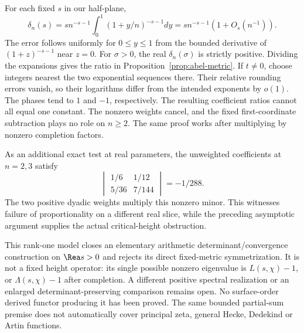 For each fixed $s$ in our half-plane,
\[
 \delta_n(s)=s n^{-s-1}\int_0^1(1+y/n)^{-s-1}dy
           =s n^{-s-1}(1+O_s(n^{-1})).
\]
The error follows uniformly for $0\le y\le1$ from the bounded derivative of $(1+z)^{-s-1}$ near $z=0$. For $\sigma>0$, the real $\delta_n(\sigma)$ is strictly positive. Dividing the expansions gives the ratio in Proposition~\ref{prop:abel-metric}. If $t\ne0$, choose integers nearest the two exponential sequences there. Their relative rounding errors vanish, so their logarithms differ from the intended exponents by $o(1)$. The phases tend to $1$ and $-1$, respectively. The resulting coefficient ratios cannot all equal one constant. The nonzero weights cancel, and the fixed first-coordinate subtraction plays no role on $n\ge2$. The same proof works after multiplying by nonzero completion factors.

As an additional exact test at real parameters, the unweighted coefficients at $n=2,3$ satisfy
\[
 \begin{vmatrix}1/6&1/12\\5/36&7/144\end{vmatrix}=-1/288.
\]
The two positive dyadic weights multiply this nonzero minor. This witnesses failure of proportionality on a different real slice, while the preceding asymptotic argument supplies the actual critical-height obstruction.

This rank-one model closes an elementary arithmetic determinant/convergence construction on $\Rea s>0$ and rejects its direct fixed-metric symmetrization. It is not a fixed height operator: its single possible nonzero eigenvalue is $L(s,\chi)-1$, or $\Lambda(s,\chi)-1$ after completion. A different positive spectral realization or an enlarged determinant-preserving comparison remains open. No surface-order derived functor producing it has been proved. The same bounded partial-sum premise does not automatically cover principal zeta, general Hecke, Dedekind or Artin functions.
